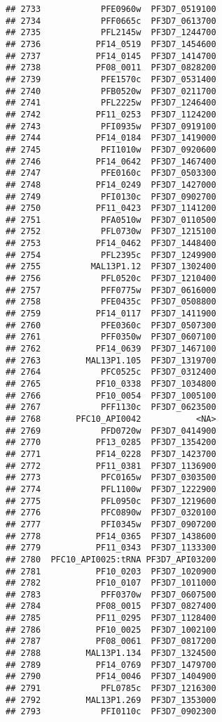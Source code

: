 \documentclass{article}\usepackage[]{graphicx}\usepackage[]{color}
\makeatletter
\newenvironment{kframe}{%
 \def\at@end@of@kframe{}%
 \ifinner\ifhmode%
  \def\at@end@of@kframe{\end{minipage}}%
  \begin{minipage}{\columnwidth}%
 \fi\fi%
 \def\FrameCommand##1{\hskip\@totalleftmargin \hskip-\fboxsep
 \colorbox{shadecolor}{##1}\hskip-\fboxsep
     \hskip-\linewidth \hskip-\@totalleftmargin \hskip\columnwidth}%
 \MakeFramed {\advance\hsize-\width
   \@totalleftmargin\z@ \linewidth\hsize
   \@setminipage}}%
 {\par\unskip\endMakeFramed%
 \at@end@of@kframe}
\newenvironment{knitrout}{}{} %
\makeatother
\begin{document}
\begin{knitrout}
\begin{kframe}
\begin{verbatim}
## 2733            PFE0960w  PF3D7_0519100
## 2734            PFF0665c  PF3D7_0613700
## 2735            PFL2145w  PF3D7_1244700
## 2736           PF14_0519  PF3D7_1454600
## 2737           PF14_0145  PF3D7_1414700
## 2738           PF08_0011  PF3D7_0828200
## 2739            PFE1570c  PF3D7_0531400
## 2740            PFB0520w  PF3D7_0211700
## 2741            PFL2225w  PF3D7_1246400
## 2742           PF11_0253  PF3D7_1124200
## 2743            PFI0935w  PF3D7_0919100
## 2744           PF14_0184  PF3D7_1419000
## 2745            PFI1010w  PF3D7_0920600
## 2746           PF14_0642  PF3D7_1467400
## 2747            PFE0160c  PF3D7_0503300
## 2748           PF14_0249  PF3D7_1427000
## 2749            PFI0130c  PF3D7_0902700
## 2750           PF11_0423  PF3D7_1141200
## 2751            PFA0510w  PF3D7_0110500
## 2752            PFL0730w  PF3D7_1215100
## 2753           PF14_0462  PF3D7_1448400
## 2754            PFL2395c  PF3D7_1249900
## 2755          MAL13P1.12  PF3D7_1302400
## 2756            PFL0520c  PF3D7_1210400
## 2757            PFF0775w  PF3D7_0616000
## 2758            PFE0435c  PF3D7_0508800
## 2759           PF14_0117  PF3D7_1411900
## 2760            PFE0360c  PF3D7_0507300
## 2761            PFF0350w  PF3D7_0607100
## 2762           PF14_0639  PF3D7_1467100
## 2763         MAL13P1.105  PF3D7_1319700
## 2764            PFC0525c  PF3D7_0312400
## 2765           PF10_0338  PF3D7_1034800
## 2766           PF10_0054  PF3D7_1005100
## 2767            PFF1130c  PF3D7_0623500
## 2768       PFC10_API0042           <NA>
## 2769            PFD0720w  PF3D7_0414900
## 2770           PF13_0285  PF3D7_1354200
## 2771           PF14_0228  PF3D7_1423700
## 2772           PF11_0381  PF3D7_1136900
## 2773            PFC0165w  PF3D7_0303500
## 2774            PFL1100w  PF3D7_1222900
## 2775            PFL0950c  PF3D7_1219600
## 2776            PFC0890w  PF3D7_0320100
## 2777            PFI0345w  PF3D7_0907200
## 2778           PF14_0365  PF3D7_1438600
## 2779           PF11_0343  PF3D7_1133300
## 2780  PFC10_API0025:tRNA PF3D7_API03200
## 2781           PF10_0203  PF3D7_1020900
## 2782           PF10_0107  PF3D7_1011000
## 2783            PFF0370w  PF3D7_0607500
## 2784           PF08_0015  PF3D7_0827400
## 2785           PF11_0295  PF3D7_1128400
## 2786           PF10_0025  PF3D7_1002100
## 2787           PF08_0061  PF3D7_0817200
## 2788         MAL13P1.134  PF3D7_1324500
## 2789           PF14_0769  PF3D7_1479700
## 2790           PF14_0046  PF3D7_1404900
## 2791            PFL0785c  PF3D7_1216300
## 2792         MAL13P1.269  PF3D7_1353000
## 2793            PFI0110c  PF3D7_0902300

\end{verbatim}
\end{kframe}
\end{knitrout}
\end{document}
